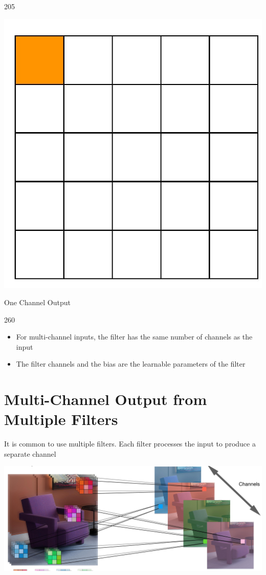 \documentclass[10pt]{article}
\begin{document}
205

\begin{center}
\includegraphics[max width=\textwidth]{2024_01_08_959e2db67a31f073f6d2g-07(9)}
\end{center}

One Channel Output

260

\begin{itemize}
  \item For multi-channel inputs, the filter has the same number of channels as the input
  \item The filter channels and the bias are the learnable parameters of the filter
\end{itemize}

\section*{Multi-Channel Output from Multiple Filters}
It is common to use multiple filters. Each filter processes the input to produce a separate channel

\begin{center}
\includegraphics[max width=\textwidth]{2024_01_08_959e2db67a31f073f6d2g-08(1)}
\end{center}
\end{document}

